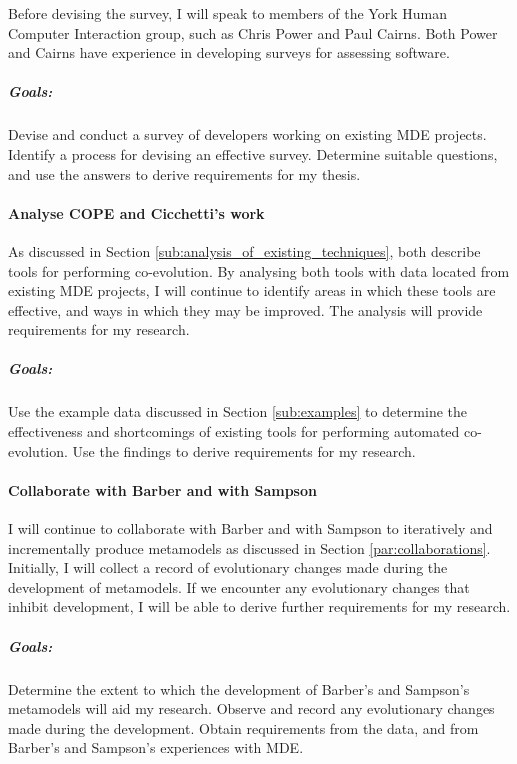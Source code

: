 Before devising the survey, I will speak to members of the York Human Computer Interaction group, such as Chris Power and Paul Cairns. Both Power and Cairns have experience in developing surveys for assessing software.

\subparagraph{Goals:} Devise and conduct a survey of developers working on existing MDE projects. Identify a process for devising an effective survey. Determine suitable questions, and use the answers to derive requirements for my thesis.



\paragraph{Analyse COPE and Cicchetti's work} %
\label{par:analyse_existing_work}
As discussed in Section \ref{sub:analysis_of_existing_techniques}, \cite{herrmannsdoerfer08cope,cicchetti08automating} both describe tools for performing co-evolution. By analysing both tools with data located from existing MDE projects, I will continue to identify areas in which these tools are effective, and ways in which they may be improved. The analysis will provide requirements for my research.

\subparagraph{Goals:} Use the example data discussed in Section \ref{sub:examples} to determine the effectiveness and shortcomings of existing tools for performing automated co-evolution. Use the findings to derive requirements for my research.



\paragraph{Collaborate with Barber and with Sampson} %
\label{par:collaborate_with_barber_and_with_sampson}
I will continue to collaborate with Barber and with Sampson to iteratively and incrementally produce metamodels as discussed in Section \ref{par:collaborations}. Initially, I will collect a record of evolutionary changes made during the development of metamodels. If we encounter any evolutionary changes that inhibit development, I will be able to derive further requirements for my research.

\subparagraph{Goals:} Determine the extent to which the development of Barber's and Sampson's metamodels will aid my research. Observe and record any evolutionary changes made during the development. Obtain requirements from the data, and from Barber's and Sampson's experiences with MDE.

